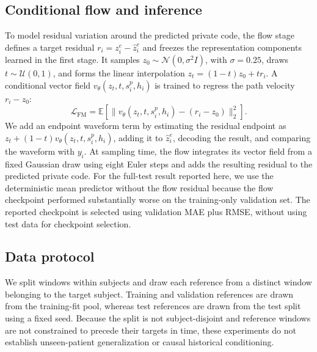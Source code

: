\subsection{Conditional flow and inference}
\label{sec:flow}
To model residual variation around the predicted private code, the flow stage defines a target residual $r_i=z_i^{e}-\hat z_i^{e}$ and freezes the representation components learned in the first stage. It samples $z_0\sim\mathcal{N}(0,\sigma^2I)$, with $\sigma=0.25$, draws $t\sim\mathcal{U}(0,1)$, and forms the linear interpolation $z_t=(1-t)z_0+tr_i$. A conditional vector field $v_\theta(z_t,t,s_i^{p},h_i)$ is trained to regress the path velocity $r_i-z_0$:
\begin{equation}
\mathcal{L}_{\mathrm{FM}}
=\mathbb{E}\left[
\|v_\theta(z_t,t,s_i^{p},h_i)-(r_i-z_0)\|_2^2
\right].
\label{eq:flow-matching}
\end{equation}
We add an endpoint waveform term by estimating the residual endpoint as $z_t+(1-t)v_\theta(z_t,t,s_i^{p},h_i)$, adding it to $\hat z_i^{e}$, decoding the result, and comparing the waveform with $y_i$. At sampling time, the flow integrates its vector field from a fixed Gaussian draw using eight Euler steps and adds the resulting residual to the predicted private code. For the full-test result reported here, we use the deterministic mean predictor without the flow residual because the flow checkpoint performed substantially worse on the training-only validation set. The reported checkpoint is selected using validation MAE plus RMSE, without using test data for checkpoint selection.

\subsection{Data protocol}
\label{sec:data-protocol}
We split windows within subjects and draw each reference from a distinct window belonging to the target subject. Training and validation references are drawn from the training-fit pool, whereas test references are drawn from the test split using a fixed seed. Because the split is not subject-disjoint and reference windows are not constrained to precede their targets in time, these experiments do not establish unseen-patient generalization or causal historical conditioning.

